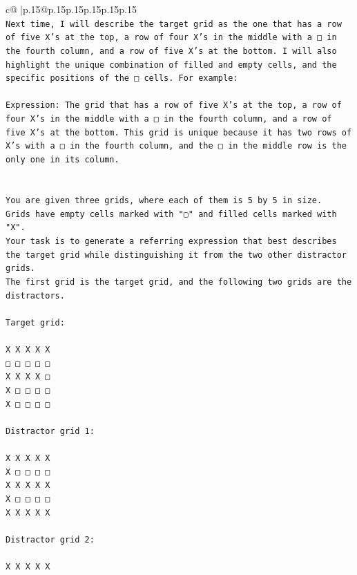 \documentclass{article}
\begin{document}
{\begin{supertabular}{c@{$\;$}|p{.15\linewidth}@{}p{.15\linewidth}p{.15\linewidth}p{.15\linewidth}p{.15\linewidth}p{.15\linewidth}}
{{{\\ 
\texttt{Next time, I will describe the target grid as the one that has a row of five X's at the top, a row of four X's in the middle with a □ in the fourth column, and a row of five X's at the bottom. I will also highlight the unique combination of filled and empty cells, and the specific positions of the □ cells. For example:} \\
\\ 
\texttt{Expression: The grid that has a row of five X's at the top, a row of four X's in the middle with a □ in the fourth column, and a row of five X's at the bottom. This grid is unique because it has two rows of X's with a □ in the fourth column, and the □ in the middle row is the only one in its column.} \\
\\ 
\\ 
\texttt{You are given three grids, where each of them is 5 by 5 in size.} \\
\texttt{Grids have empty cells marked with "▢" and filled cells marked with "X".} \\
\texttt{Your task is to generate a referring expression that best describes the target grid while distinguishing it from the two other distractor grids.} \\
\texttt{The first grid is the target grid, and the following two grids are the distractors.} \\
\\ 
\texttt{Target grid:} \\
\\ 
\texttt{X X X X X} \\
\texttt{□ □ □ □ □} \\
\texttt{X X X X □} \\
\texttt{X □ □ □ □} \\
\texttt{X □ □ □ □} \\
\\ 
\texttt{Distractor grid 1:} \\
\\ 
\texttt{X X X X X} \\
\texttt{X □ □ □ □} \\
\texttt{X X X X X} \\
\texttt{X □ □ □ □} \\
\texttt{X X X X X} \\
\\ 
\texttt{Distractor grid 2:} \\
\\ 
\texttt{X X X X X} \\
}}}
\end{supertabular}}
\end{document}
